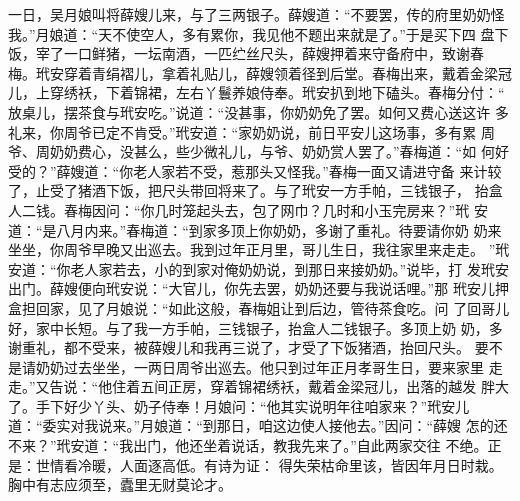 一日，吴月娘叫将薛嫂儿来，与了三两银子。薛嫂道：“不要罢，传的府里奶奶怪
我。”月娘道：“天不使空人，多有累你，我见他不题出来就是了。”于是买下四
盘下饭，宰了一口鲜猪，一坛南酒，一匹纻丝尺头，薛嫂押着来守备府中，致谢春
梅。玳安穿着青绢褶儿，拿着礼贴儿，薛嫂领着径到后堂。春梅出来，戴着金梁冠
儿，上穿绣袄，下着锦裙，左右丫鬟养娘侍奉。玳安扒到地下磕头。春梅分付：“
放桌儿，摆茶食与玳安吃。”说道：“没甚事，你奶奶免了罢。如何又费心送这许
多礼来，你周爷已定不肯受。”玳安道：“家奶奶说，前日平安儿这场事，多有累
周爷、周奶奶费心，没甚么，些少微礼儿，与爷、奶奶赏人罢了。”春梅道：“如
何好受的？”薛嫂道：“你老人家若不受，惹那头又怪我。”春梅一面又请进守备
来计较了，止受了猪酒下饭，把尺头带回将来了。与了玳安一方手帕，三钱银子，
抬盒人二钱。春梅因问：“你几时笼起头去，包了网巾？几时和小玉完房来？”玳
安道：“是八月内来。”春梅道：“到家多顶上你奶奶，多谢了重礼。待要请你奶
奶来坐坐，你周爷早晚又出巡去。我到过年正月里，哥儿生日，我往家里来走走。
”玳安道：“你老人家若去，小的到家对俺奶奶说，到那日来接奶奶。”说毕，打
发玳安出门。薛嫂便向玳安说：“大官儿，你先去罢，奶奶还要与我说话哩。”那
玳安儿押盒担回家，见了月娘说：“如此这般，春梅姐让到后边，管待茶食吃。问
了回哥儿好，家中长短。与了我一方手帕，三钱银子，抬盒人二钱银子。多顶上奶
奶，多谢重礼，都不受来，被薛嫂儿和我再三说了，才受了下饭猪酒，抬回尺头。
要不是请奶奶过去坐坐，一两日周爷出巡去。他只到过年正月孝哥生日，要来家里
走走。”又告说：“他住着五间正房，穿着锦裙绣袄，戴着金梁冠儿，出落的越发
胖大了。手下好少丫头、奶子侍奉！月娘问：“他其实说明年往咱家来？”玳安儿
道：“委实对我说来。”月娘道：“到那日，咱这边使人接他去。”因问：“薛嫂
怎的还不来？”玳安道：“我出门，他还坐着说话，教我先来了。”自此两家交往
不绝。正是：世情看冷暖，人面逐高低。有诗为证：
得失荣枯命里该，皆因年月日时栽。
胸中有志应须至，蠹里无财莫论才。